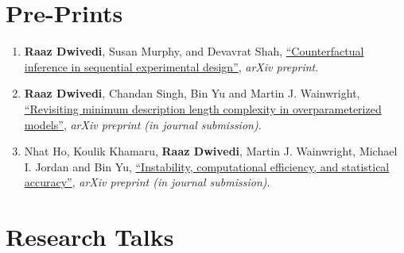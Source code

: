 \documentclass[margin,centered]{res}
\newcommand{\ptitle}[1]{``#1''}
\begin{document}
\begin{resume}
\section{\sc Pre-Prints} 

\begin{enumerate}[label={P\arabic*.},leftmargin=*]
\item \textbf{Raaz Dwivedi}, Susan Murphy, and Devavrat Shah, \href{https://arxiv.org/abs/2202.06891}{\ptitle{Counterfactual inference in sequential experimental design}}, \textit{arXiv preprint}.
\item \textbf{Raaz Dwivedi}\eqc, {Chandan Singh}\eqc, Bin Yu and Martin
J. Wainwright, \href{https://arxiv.org/abs/2006.10189}{\ptitle{Revisiting minimum description length complexity in overparameterized models}}, \textit{arXiv preprint (in journal submission)}.
\item Nhat Ho\eqc, Koulik Khamaru\eqc, \textbf{Raaz Dwivedi}\eqc, Martin
J. Wainwright, Michael I. Jordan and Bin Yu,  \href{https://arxiv.org/abs/2005.11411}
{\ptitle{Instability, computational efficiency,
and statistical accuracy}}, \textit{arXiv preprint (in journal submission)}.
\end{enumerate}








\section{\sc Research Talks}


\end{resume}
\end{document}
